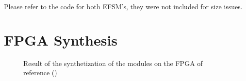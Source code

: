 \documentclass[12pt]{article}
\begin{document}
Please refer to the code for both EFSM's, they were not included for size issues.

\section{FPGA Synthesis}
\begin{figure}[h!]
	\begin{center}
	 \caption{Result of the synthetization of the modules on the FPGA of reference ()}
	\end{center}
\end{figure}
\end{document}
